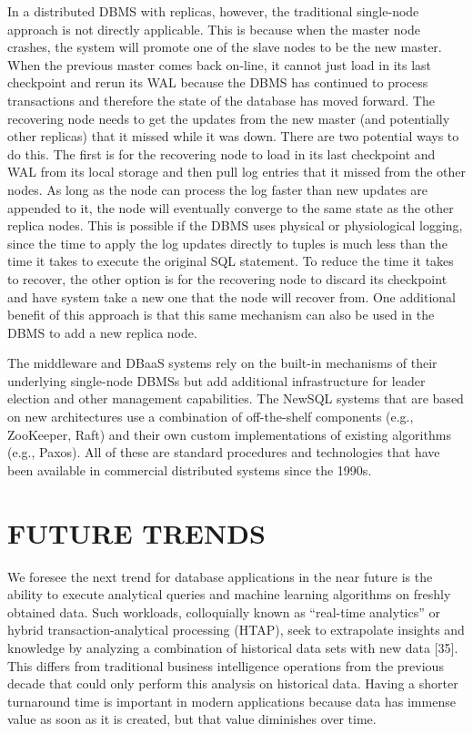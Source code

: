 \documentclass[a4paper,12pt,notitlepage,twoside,openright]{article}
\begin{document}
In a distributed DBMS with replicas, however, the traditional
single-node approach is not directly applicable. This is because when
the master node crashes, the system will promote one of the slave nodes
to be the new master. When the previous master comes back on-line, it
cannot just load in its last checkpoint and rerun its WAL because the
DBMS has continued to process transactions and therefore the state of
the database has moved forward. The recovering node needs to get the
updates from the new master (and potentially other replicas) that it
missed while it was down. There are two potential ways to do this. The
first is for the recovering node to load in its last checkpoint and WAL
from its local storage and then pull log entries that it missed from the
other nodes. As long as the node can process the log faster than new
updates are appended to it, the node will eventually converge to the
same state as the other replica nodes. This is possible if the DBMS uses
physical or physiological logging, since the time to apply the log
updates directly to tuples is much less than the time it takes to
execute the original SQL statement. To reduce the time it takes to
recover, the other option is for the recovering node to discard its
checkpoint and have system take a new one that the node will recover
from. One additional benefit of this approach is that this same
mechanism can also be used in the DBMS to add a new replica node.

The middleware and DBaaS systems rely on the built-in mechanisms of
their underlying single-node DBMSs but add additional infrastructure for
leader election and other management capabilities. The NewSQL systems
that are based on new architectures use a combination of off-the-shelf
components (e.g., ZooKeeper, Raft) and their own custom implementations
of existing algorithms (e.g., Paxos). All of these are standard
procedures and technologies that have been available in commercial
distributed systems since the 1990s.

\hypertarget{future-trends}{%
\section{FUTURE TRENDS}\label{future-trends}}

We foresee the next trend for database applications in the near future
is the ability to execute analytical queries and machine learning
algorithms on freshly obtained data. Such workloads, colloquially known
as ``real-time analytics'' or hybrid transaction-analytical processing
(HTAP), seek to extrapolate insights and knowledge by analyzing a
combination of historical data sets with new data {[}35{]}. This differs
from traditional business intelligence operations from the previous
decade that could only perform this analysis on historical data. Having
a shorter turnaround time is important in modern applications because
data has immense value as soon as it is created, but that value
diminishes over time.
\end{document}
